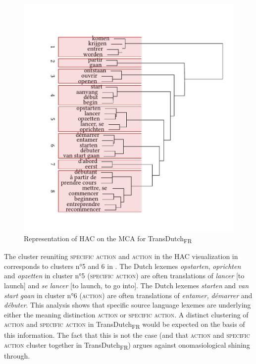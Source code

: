\begin{figure}
\includegraphics[width=\textwidth]{figures/tree93.pdf}
\caption{\label{fig:4:90}  Representation of HAC on the MCA for TransDutch\textsubscript{FR}}
\end{figure}

The cluster reuniting {\textsc{specific}} \textsc{action} and \textsc{action} in the HAC visualization in  corresponds to clusters n°5 and 6 in . The Dutch lexemes \textit{opstarten}, \textit{oprichten} and \textit{opzetten} in cluster n°5 ({\textsc{specific}} \textsc{action}) are often translations of \textit{lancer} [to launch] and \textit{se} \textit{lancer} [to launch, to go into]. The Dutch lexemes \textit{starten} and \textit{van} \textit{start} \textit{gaan} in cluster n°6 (\textsc{action}) are often translations of \textit{entamer,} \textit{démarrer} and \textit{débuter}. This analysis shows that specific source language lexemes are underlying either the meaning distinction \textsc{action} or {\textsc{specific}} \textsc{action}. A distinct clustering of \textsc{action} and {\textsc{specific}} \textsc{action} in TransDutch\textsubscript{FR} would be expected on the basis of this information. The fact that this is not the case (and that \textsc{action} and {\textsc{specific}} \textsc{action} cluster together in TransDutch\textsubscript{FR}) argues against onomasiological shining through.

